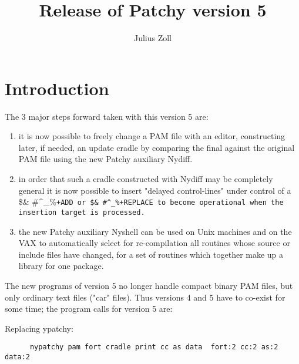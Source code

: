 \setlength{\textwidth}{16cm}
\setlength{\hoffset}{-15mm}
\newcommand{\Lit}[1]{{\tt #1}}
\makeatletter
\def\@m@n@sanitize{\@makeother\$\@makeother\&%
\@makeother\#\@makeother\^\@makeother\_\@makeother\%\@makeother\~}
\def\Lit{\begingroup\@m@n@sanitize\@Lit}
\def\@Lit#1{\tt{#1}\endgroup}%
\makeatother
\title{Release of Patchy version 5}
\author{Julius Zoll}

\maketitle

\section*{Introduction}

The 3 major steps forward taken with this version 5 are:

\begin{enumerate}

\item 
it is now possible to freely change a PAM file with an editor,
constructing later, if needed, an update cradle by comparing
the final against the original PAM file using the new Patchy
auxiliary Nydiff.

\item
in order that such a cradle constructed with Nydiff may be completely
general it is now possible to insert "delayed control-lines" under
control of a \Lit{+ADD} or \Lit{+REPLACE} to become operational when the insertion
target is processed.

\item
the new Patchy auxiliary Nyshell can be used on Unix machines and
on the VAX to automatically select for re-compilation all routines whose
source or include files have changed, for a set of routines which together
make up a library for one package.
\end{enumerate}

The new programs of version 5 no longer handle compact binary PAM files,
but only ordinary text files ("car" files). Thus versions 4 and 5 have
to co-exist for some time; the program calls for version 5 are:

Replacing ypatchy:

\begin{verbatim}
      nypatchy pam fort cradle print cc as data  fort:2 cc:2 as:2 data:2
\end{verbatim}

